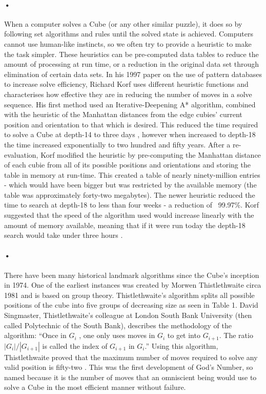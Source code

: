 \documentclass{article}
\begin{document}
\paragraph{•}
When a computer solves a Cube (or any other similar puzzle), it does so by following set algorithms and rules until the solved state is achieved. Computers cannot use human-like instincts, so we often try to provide a heuristic to make the task simpler. These heuristics can be pre-computed data tables to reduce the amount of processing at run time, or a reduction in the original data set through elimination of certain data sets. In his 1997 paper on the use of pattern databases to increase solve efficiency, Richard Korf uses different heuristic functions and characterises how effective they are in reducing the number of moves in a solve sequence. His first method used an Iterative-Deepening A* algorithm, combined with the heuristic of the Manhattan distances from the edge cubies’ current position and orientation to that which is desired. This reduced the time required to solve a Cube at depth-14 to three days , however when increased to depth-18 the time increased exponentially to two hundred and fifty years. After a re-evaluation, Korf modified the heuristic by pre-computing the Manhattan distance of each cubie from all of its possible positions and orientations and storing the table in memory at run-time. This created a table of nearly ninety-million entries - which would have been bigger but was restricted by the available memory (the table was approximately forty-two megabytes). The newer heuristic reduced the time to search at depth-18 to less than four weeks - a reduction of ~99.97\%. Korf suggested that the speed of the algorithm used would increase linearly with the amount of memory available, meaning that if it were run today the depth-18 search would take under three hours \cite{Korf1997}.
\paragraph{•}
There have been many historical landmark algorithms since the Cube's inception in 1974. One of the earliest instances was created by Morwen Thistlethwaite circa 1981 and is based on group theory. Thistlethwaite's algorithm splits all possible positions of the cube into five groups of decreasing size as seen in Table 1. David Singmaster, Thistlethwaite's colleague at London South Bank University (then called Polytechnic of the South Bank), describes the methodology of the algorithm: \enquote{Once in $G_{i}$ , one only uses moves in $G_{i}$ to get into $G_{i+1}$. The ratio $|G_{i} |/|G_{i+1} |$  is called the index of $G_{i+1}$ in $G_{i}$.} Using this algorithm, Thistlethwaite proved that the maximum number of moves required to solve any valid position is fifty-two \cite{Singmaster1981}. This was the first development of God's Number, so named because it is the number of moves that an omniscient being would use to solve a Cube in the most efficient manner without failure. 
\end{document}
